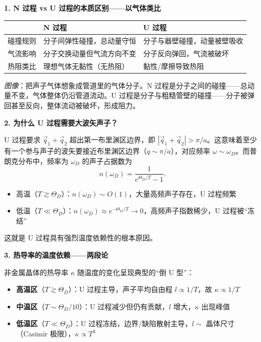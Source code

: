 \begin{insightbox}[物理图像与概念深化]
\textbf{1. N 过程 vs U 过程的本质区别——以气体类比}

\begin{center}
\begin{tabular}{p{2.5cm}p{5.5cm}p{5.5cm}}
\toprule
 & \textbf{N 过程} & \textbf{U 过程} \\
\midrule
碰撞规则 & 分子间弹性碰撞，总动量守恒 & 分子与器壁碰撞，动量被壁吸收 \\
\addlinespace
气流影响 & 分子交换动量但气流方向不变 & 分子反向弹回，气流被破坏 \\
\addlinespace
热阻类比 & 理想气体无黏性（无热阻） & 黏性/摩擦导致热阻 \\
\bottomrule
\end{tabular}
\end{center}

\textit{图像}：把声子气体想象成管道里的气体分子。N 过程是分子之间的碰撞——总动量不变，气体整体仍沿管道流动。U 过程是分子与粗糙管壁的碰撞——分子被弹回甚至反向，整体流动被破坏，形成阻力。

\textbf{2. 为什么 U 过程需要大波矢声子？}

U 过程要求 $\vec q_1+\vec q_2$ 超出第一布里渊区边界，即 $|\vec q_1+\vec q_2|>\pi/a$。这意味着至少有一个参与声子的波矢要接近布里渊区边界（$q\sim\pi/a$），对应频率 $\omega\sim\omega_D$。而普朗克分布中，频率为 $\omega_D$ 的声子占据数为
\begin{equation}
n(\omega_D)=\frac{1}{e^{\Theta_D/T}-1}.
\end{equation}

\begin{itemize}
    \item 高温（$T\gtrsim\Theta_D$）：$n(\omega_D)\sim O(1)$，大量高频声子存在，U 过程频繁
    \item 低温（$T\ll\Theta_D$）：$n(\omega_D)\approx e^{-\Theta_D/T}\to0$，高频声子指数稀少，U 过程被``冻结''
\end{itemize}

这就是 U 过程具有强烈温度依赖性的根本原因。

\textbf{3. 热导率的温度依赖——两段论}

非金属晶体的热导率 $\kappa$ 随温度的变化呈现典型的``倒 U 型''：

\begin{itemize}
    \item \textbf{高温区}（$T\gtrsim\Theta_D$）：U 过程主导，声子平均自由程 $l\propto1/T$，故 $\kappa\propto1/T$
    \item \textbf{中温区}（$T\sim\Theta_D/10$）：U 过程减少但仍有贡献，$l$ 增大，$\kappa$ 出现峰值
    \item \textbf{低温区}（$T\ll\Theta_D$）：U 过程冻结，边界/缺陷散射主导，$l\sim$ 晶体尺寸（Casimir 极限），$\kappa\propto T^3$
\end{itemize}


\end{insightbox}
